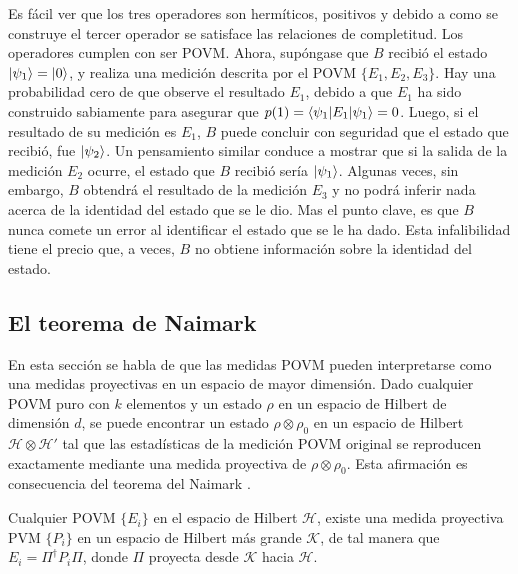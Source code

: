 Es fácil ver que los tres operadores son hermíticos, positivos y debido a como
se construye el tercer operador se satisface las relaciones de completitud. Los
operadores cumplen con ser POVM\@. Ahora, supóngase que $B$ recibió el estado
$|\psi_1\rangle=|0\rangle$, y realiza una medición descrita por el POVM
$\{E_1,E_2,E_3\}$. Hay una probabilidad cero de que observe el resultado $E_1$,
debido a que $E_1$ ha sido construido sabiamente para asegurar que
$p(1)=\langle\psi_1|E_1|\psi_1\rangle=0$. Luego, si el resultado de su medición es
$E_1$, $B$ puede concluir con seguridad que el estado que recibió, fue
$|\psi_2\rangle $. Un pensamiento similar conduce a mostrar que si la salida de la
medición $E_2$ ocurre, el estado que $B$ recibió sería $|\psi_1\rangle$. Algunas
veces, sin embargo, $B$ obtendrá el resultado de la medición $E_3$ y no podrá
inferir nada acerca de la identidad del estado que se le dio. Mas el punto
clave, es que $B$ nunca comete un error al identificar el estado que se le ha
dado. Esta infalibilidad tiene el precio que, a veces, $B$ no obtiene
información sobre la identidad del estado.

\subsection{El teorema de Naimark} %
En esta sección se habla de que las medidas POVM pueden interpretarse como una
medidas proyectivas en un espacio de mayor dimensión.  Dado cualquier POVM puro
con $k$ elementos y un estado $\rho$ en un espacio de Hilbert de dimensión $d$,
se puede encontrar un estado $\rho \otimes \rho_0$ en un espacio de Hilbert
$\mathcal{H}\otimes\mathcal{H'}$ tal que las estadísticas de la medición POVM
original se reproducen exactamente mediante una medida proyectiva de $\rho
\otimes \rho_0$. Esta afirmación es consecuencia del teorema del Naimark
{\cite{2007geometry}}.

\begin{theorem} 
Cualquier POVM $\{E_i\}$ en el espacio de Hilbert $\mathcal{H}$, existe una
medida proyectiva PVM $\{P_i\}$ en un espacio de Hilbert más grande
$\mathcal{K}$, de tal manera que $E_i=\Pi^\dagger P_i\Pi$, donde $\Pi$ proyecta
desde $\mathcal{K}$ hacia $\mathcal{H}$.
\end{theorem}
	

